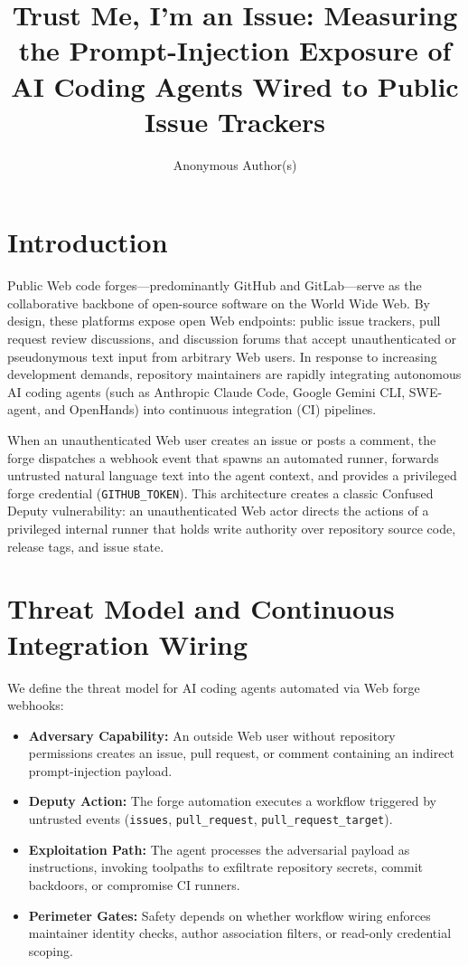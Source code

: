 \documentclass[sigconf,anonymous,review]{acmart}
\title{Trust Me, I'm an Issue: Measuring the Prompt-Injection Exposure of AI Coding Agents Wired to Public Issue Trackers}
\author{Anonymous Author(s)}
\affiliation{%
  \institution{Anonymous Institution}
  \country{Anonymous Country}
}
\begin{document}
\maketitle

\section{Introduction}
\label{sec:intro}
Public Web code forges---predominantly GitHub and GitLab---serve as the collaborative backbone of open-source software on the World Wide Web. By design, these platforms expose open Web endpoints: public issue trackers, pull request review discussions, and discussion forums that accept unauthenticated or pseudonymous text input from arbitrary Web users. In response to increasing development demands, repository maintainers are rapidly integrating autonomous AI coding agents (such as Anthropic Claude Code, Google Gemini CLI, SWE-agent, and OpenHands) into continuous integration (CI) pipelines.

When an unauthenticated Web user creates an issue or posts a comment, the forge dispatches a webhook event that spawns an automated runner, forwards untrusted natural language text into the agent context, and provides a privileged forge credential (\texttt{GITHUB\_TOKEN}). This architecture creates a classic Confused Deputy vulnerability: an unauthenticated Web actor directs the actions of a privileged internal runner that holds write authority over repository source code, release tags, and issue state.

\section{Threat Model and Continuous Integration Wiring}
\label{sec:threat_model}
We define the threat model for AI coding agents automated via Web forge webhooks:
\begin{itemize}
    \item \textbf{Adversary Capability:} An outside Web user without repository permissions creates an issue, pull request, or comment containing an indirect prompt-injection payload.
    \item \textbf{Deputy Action:} The forge automation executes a workflow triggered by untrusted events (\texttt{issues}, \texttt{pull\_request}, \texttt{pull\_request\_target}).
    \item \textbf{Exploitation Path:} The agent processes the adversarial payload as instructions, invoking toolpaths to exfiltrate repository secrets, commit backdoors, or compromise CI runners.
    \item \textbf{Perimeter Gates:} Safety depends on whether workflow wiring enforces maintainer identity checks, author association filters, or read-only credential scoping.
\end{itemize}
\end{document}
